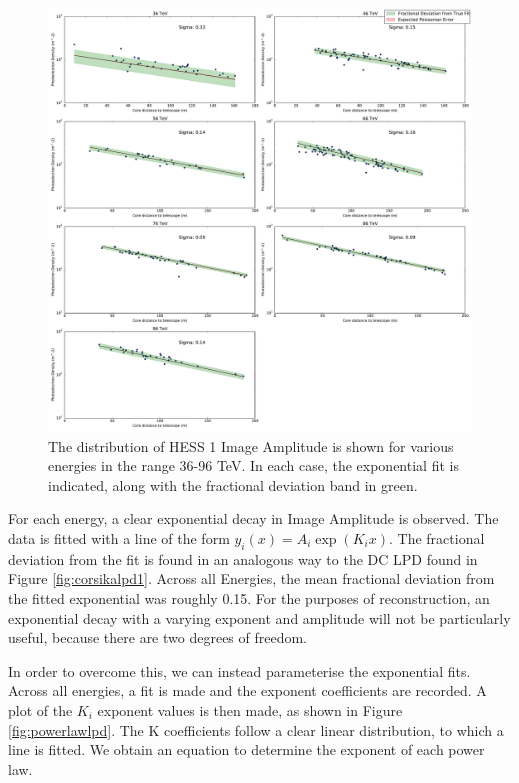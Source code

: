 \documentclass{article}
\begin{document}
\begin{figure}
\begin{center}
\includegraphics[width=\textwidth]{corsikafullshowerlpd}
\caption{The distribution of HESS 1 Image Amplitude is shown for various energies in the range 36-96 TeV. In each case, the exponential fit is indicated, along with the fractional deviation band in green.}
\label{fig:fullshowerlpd}
\end{center}
\end{figure}

For each energy, a clear exponential decay in Image Amplitude is observed. The data is fitted with a line of the form $y_{i} (x) =A_{i} \exp (K_{i} x)$. The fractional deviation from the fit is found in an analogous way to the DC LPD found in Figure \ref{fig:corsikalpd1}. Across all Energies, the mean fractional deviation from the fitted exponential was roughly 0.15. For the purposes of reconstruction, an exponential decay with a varying exponent and amplitude will not be particularly useful, because there are two degrees of freedom.

In order to overcome this, we can instead parameterise the exponential fits. Across all energies, a fit is made and the exponent coefficients are recorded. A plot of the $K_{i}$ exponent values is then made, as shown in Figure  \ref{fig:powerlawlpd}. The K coefficients follow a clear linear distribution, to which a line is fitted. We obtain an equation to determine the exponent of each power law. 
\end{document}
